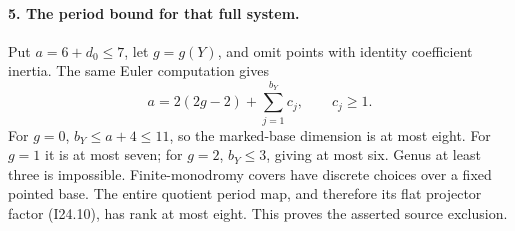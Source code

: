 \paragraph{5. The period bound for that full system.}
Put \(a=6+d_0\le7\), let \(g=g(Y)\), and omit points with
identity coefficient inertia. The same Euler computation gives
\[
                       a=2(2g-2)+\sum_{j=1}^{b_Y}c_j,
                       \qquad c_j\ge1.                    \tag{I24.14}
\]
For \(g=0\), \(b_Y\le a+4\le11\), so the marked-base
dimension is at most eight. For \(g=1\) it is at most seven;
for \(g=2\), \(b_Y\le3\), giving at most six. Genus at
least three is impossible. Finite-monodromy covers have discrete
choices over a fixed pointed base. The entire quotient period map,
and therefore its flat projector factor (I24.10), has rank at
most eight. This proves the asserted source exclusion.

